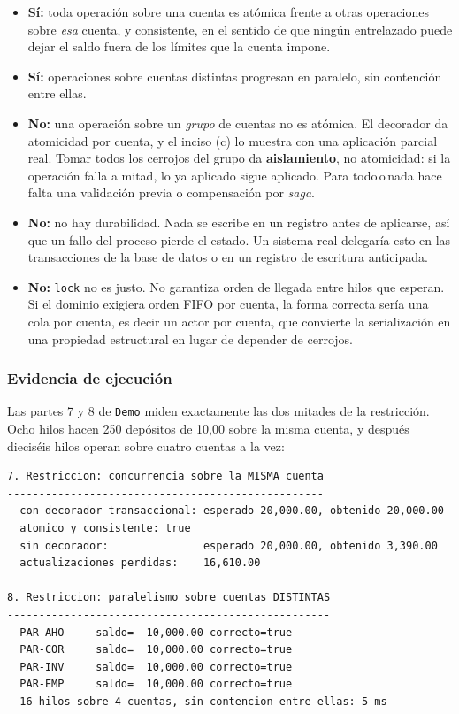 \begin{itemize}[leftmargin=1.2cm]
    \item \textbf{Sí:} toda operación sobre una cuenta es atómica frente a otras operaciones
          sobre \emph{esa} cuenta, y consistente, en el sentido de que ningún entrelazado
          puede dejar el saldo fuera de los límites que la cuenta impone.
    \item \textbf{Sí:} operaciones sobre cuentas distintas progresan en paralelo, sin
          contención entre ellas.
    \item \textbf{No:} una operación sobre un \emph{grupo} de cuentas no es atómica. El
          decorador da atomicidad por cuenta, y el inciso (c) lo muestra con una aplicación
          parcial real. Tomar todos los cerrojos del grupo da \textbf{aislamiento}, no
          atomicidad: si la operación falla a mitad, lo ya aplicado sigue aplicado. Para
          todo\,o\,nada hace falta una validación previa o compensación por \textit{saga}.
    \item \textbf{No:} no hay durabilidad. Nada se escribe en un registro antes de aplicarse,
          así que un fallo del proceso pierde el estado. Un sistema real delegaría esto en las
          transacciones de la base de datos o en un registro de escritura anticipada.
    \item \textbf{No:} \texttt{lock} no es justo. No garantiza orden de llegada entre hilos
          que esperan. Si el dominio exigiera orden FIFO por cuenta, la forma correcta sería
          una cola por cuenta, es decir un actor por cuenta, que convierte la serialización en
          una propiedad estructural en lugar de depender de cerrojos.
\end{itemize}

\subsubsection*{Evidencia de ejecución}

Las partes 7 y 8 de \texttt{Demo} miden exactamente las dos mitades de la restricción. Ocho
hilos hacen 250 depósitos de 10,00 sobre la misma cuenta, y después dieciséis hilos operan
sobre cuatro cuentas a la vez:

{\small
\begin{verbatim}
7. Restriccion: concurrencia sobre la MISMA cuenta
--------------------------------------------------
  con decorador transaccional: esperado 20,000.00, obtenido 20,000.00
  atomico y consistente: true
  sin decorador:               esperado 20,000.00, obtenido 3,390.00
  actualizaciones perdidas:    16,610.00

8. Restriccion: paralelismo sobre cuentas DISTINTAS
---------------------------------------------------
  PAR-AHO     saldo=  10,000.00 correcto=true
  PAR-COR     saldo=  10,000.00 correcto=true
  PAR-INV     saldo=  10,000.00 correcto=true
  PAR-EMP     saldo=  10,000.00 correcto=true
  16 hilos sobre 4 cuentas, sin contencion entre ellas: 5 ms
\end{verbatim}
}

